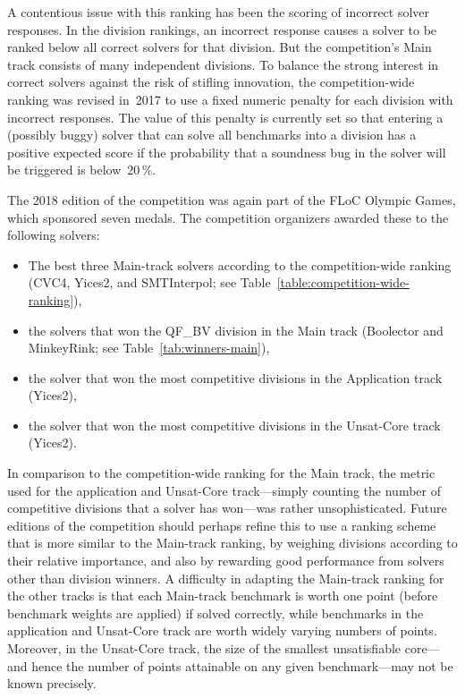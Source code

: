 \documentclass[dvipsnames,table,twoside,11pt]{article}
\begin{document}
A contentious issue with this ranking has been the scoring of
incorrect solver responses.  In the division rankings, an incorrect
response causes a solver to be ranked below all correct solvers for
that division.  But the competition's Main track consists of many
independent divisions.  To balance the strong interest in correct
solvers against the risk of stifling innovation, the competition-wide
ranking was revised in~2017 to use a fixed numeric penalty for each
division with incorrect responses.  The value of this penalty is
currently set so that entering a (possibly buggy) solver that can
solve all benchmarks into a division has a positive expected score if
the probability that a soundness bug in the solver will be triggered
is below~$20\,\%$.~\cite{rules18}

The 2018 edition of the competition was again part of the FLoC Olympic
Games, which sponsored seven medals.  The competition organizers
awarded these to the following solvers:
\begin{itemize}
\item The best three Main-track solvers according to the
  competition-wide ranking (CVC4, Yices2, and SMTInterpol; see
  Table~\ref{table:competition-wide-ranking}),
\item the solvers that won the QF\_BV division in the Main track
  (Boolector and MinkeyRink; see Table~\ref{tab:winners-main}),
\item the solver that won the most competitive divisions in the
  Application track (Yices2),
\item the solver that won the most competitive divisions in the
  Unsat-Core track (Yices2).
\end{itemize}

In comparison to the competition-wide ranking for the Main track, the
metric used for the application and Unsat-Core track---simply counting
the number of competitive divisions that a solver has won---was rather
unsophisticated.  Future editions of the competition should perhaps
refine this to use a ranking scheme that is more similar to the
Main-track ranking, by weighing divisions according to their relative
importance, and also by rewarding good performance from solvers other
than division winners.  A difficulty in adapting the Main-track
ranking for the other tracks is that each Main-track benchmark is
worth one point (before benchmark weights are applied) if solved
correctly, while benchmarks in the application and Unsat-Core track
are worth widely varying numbers of points.  Moreover, in the
Unsat-Core track, the size of the smallest unsatisfiable core---and
hence the number of points attainable on any given benchmark---may not
be known precisely.
\end{document}
